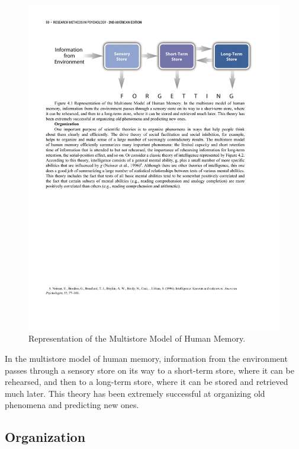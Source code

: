  
\begin{figure}
 
      \includegraphics[width=\linewidth]{figures/C4Memory.pdf}
 
      \caption{Representation of the Multistore Model of Human Memory.}
 
      \label{fig:Memory}
 
\end{figure}
 
 
In the multistore model of human memory, information from the environment passes through a sensory store on its way to a short-term store, where it can be rehearsed, and then to a long-term store, where it can be stored and retrieved much later. This theory has been extremely successful at organizing old phenomena and predicting new ones.
 
\subsection{Organization}
 
